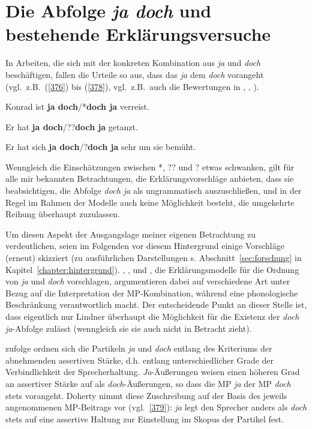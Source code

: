 \section{Die Abfolge \textit{ja doch} und bestehende Erklärungsversuche}
\label{sec:abfolgejd}
In Arbeiten, die sich mit der konkreten Kombination aus \textit{ja} und \textit{doch} beschäftigen, fallen die Urteile so aus, dass das \textit{ja} dem \textit{doch} vorangeht (vgl.\ z.B.\ (\ref{376}) bis (\ref{378}), vgl.\ z.B.\ auch die Bewertungen in \citealt[101]{Meibauer1994}, \citealt[93]{Ormelius-Sandblom1997}, \citealt[431]{Rinas2007}).
\begin{exe}
	\ex\label{376} 
	Konrad ist \textbf{ja doch}/*\textbf{doch ja} verreist.
\hfill\hbox{\citet[114]{Doherty1987}}
\end{exe}
\begin{exe}
	\ex\label{377} 
	Er hat \textbf{ja doch}/??\textbf{doch ja} getanzt.
\hfill\hbox{\citet[20]{Struckmeier2014}}
\end{exe}
\begin{exe}
	\ex\label{378} 
	Er hat sich \textbf{ja doch}/?\textbf{doch ja} sehr um sie bemüht.
\hfill\hbox{\citet[157]{Jacobs1991}}
\end{exe}
Wenngleich die Einschätzungen zwischen *, ?? und ? etwas schwanken, gilt für alle mir bekannten Betrachtungen, die Erklärungsvorschläge anbieten, dass sie beabsichtigen, die Abfolge \textit{doch ja} als ungrammatisch auszuschließen, und in der Regel im Rahmen der Modelle auch keine Möglichkeit besteht, die umgekehrte Reihung überhaupt zuzulassen.

Um diesen Aspekt der Ausgangslage meiner eigenen Betrachtung zu verdeutlichen, seien im Folgenden vor diesem Hintergrund einige Vorschläge (erneut) skizziert (zu ausführlichen Darstellungen s. Abschnitt~\ref{sec:forschung} in Kapitel~\ref{chapter:hintergrund}). \citet{Doherty1985, Doherty1987}, \citet{Ickler1994}, \citet{Ormelius-Sandblom1997} und \citet{Rinas2007}, die Erklärungsmodelle für die Ordnung von \textit{ja} und \textit{doch} vorschlagen, argumentieren dabei auf verschiedene Art unter Bezug auf die Interpretation der MP-Kombination, während \citet{Lindner1991} eine phonologische Beschränkung verantwortlich macht. Der entscheidende Punkt an dieser Stelle ist, dass eigentlich nur Lindner überhaupt die Möglichkeit für die Existenz der \textit{doch ja}-Abfolge zulässt (wenngleich sie sie auch nicht in Betracht zieht).

\citet{Doherty1985, Doherty1987} zufolge ordnen sich die Partikeln \textit{ja} und \textit{doch} entlang des Kriteriums der  abnehmenden assertiven Stärke, d.h. entlang unterschiedlicher Grade der Verbindlichkeit der Sprecherhaltung. \textit{Ja}-Äußerungen weisen einen höheren Grad an assertiver Stärke auf als \textit{doch}-Äußerungen, so dass die MP \textit{ja} der MP \textit{doch} stets vorangeht. Doherty nimmt diese Zuschreibung auf der Basis des jeweils angenommenen MP-Beitrags vor (vgl.\ \ref{379}): \textit{ja} legt den Sprecher anders als \textit{doch} stets auf eine assertive Haltung zur Einstellung im Skopus der Partikel fest.


